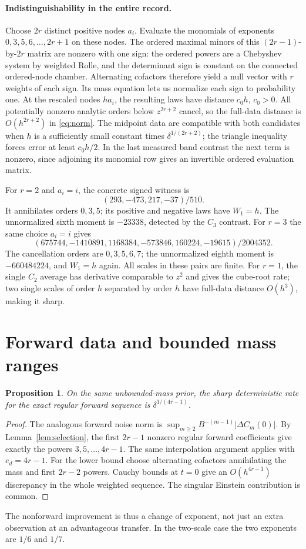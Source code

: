 \documentclass[11pt]{article}
\newtheorem{proposition}{Proposition}
\begin{document}
\paragraph{Indistinguishability in the entire record.}
Choose \(2r\) distinct positive nodes \(a_i\). Evaluate the monomials of exponents \(0,3,5,6,\ldots,2r+1\) on these nodes. The ordered maximal minors of this \((2r-1)\)-by-\(2r\) matrix are nonzero with one sign: the ordered powers are a Chebyshev system by weighted Rolle, and the determinant sign is constant on the connected ordered-node chamber. Alternating cofactors therefore yield a null vector with \(r\) weights of each sign. Its mass equation lets us normalize each sign to probability one. At the rescaled nodes \(ha_i\), the resulting laws have distance \(c_0h\), \(c_0>0\). All potentially nonzero analytic orders below \(z^{2r+2}\) cancel, so the full-data distance is \(O(h^{2r+2})\) in \eqref{eq:norm}. The midpoint data are compatible with both candidates when \(h\) is a sufficiently small constant times \(\delta^{1/(2r+2)}\); the triangle inequality forces error at least \(c_0h/2\). In the last measured band contrast the next term is nonzero, since adjoining its monomial row gives an invertible ordered evaluation matrix.

For \(r=2\) and \(a_i=i\), the concrete signed witness is
\[
 (293,-473,217,-37)/510 .
\]
It annihilates orders \(0,3,5\); its positive and negative laws have \(W_1=h\). The unnormalized sixth moment is \(-23338\), detected by the \(C_3\) contrast. For \(r=3\) the same choice \(a_i=i\) gives
\[
 (675744,-1410891,1168384,-573846,160224,-19615)/2004352 .
\]
The cancellation orders are \(0,3,5,6,7\); the unnormalized eighth moment is
\(-660484224\), and \(W_1=h\) again. All scales in these pairs are finite. For \(r=1\), the single \(C_2\) average has derivative comparable to \(z^2\) and gives the cube-root rate; two single scales of order \(h\) separated by order \(h\) have full-data distance \(O(h^3)\), making it sharp.

\section{Forward data and bounded mass ranges}
\begin{proposition}\label{prop:forward}
On the same unbounded-mass prior, the sharp deterministic rate for the exact regular forward sequence is \(\delta^{1/(4r-1)}\).
\end{proposition}
\begin{proof}
The analogous forward noise norm is \(\sup_{m\ge2}B^{-(m-1)}|\Delta C_m(0)|\). By Lemma~\ref{lem:selection}, the first \(2r-1\) nonzero regular forward coefficients give exactly the powers \(3,5,\ldots,4r-1\). The same interpolation argument applies with \(e_d=4r-1\). For the lower bound choose alternating cofactors annihilating the mass and first \(2r-2\) powers. Cauchy bounds at \(t=0\) give an \(O(h^{4r-1})\) discrepancy in the whole weighted sequence. The singular Einstein contribution is common.
\end{proof}
The nonforward improvement is thus a change of exponent, not just an extra observation at an advantageous transfer. In the two-scale case the two exponents are \(1/6\) and \(1/7\).
\end{document}
